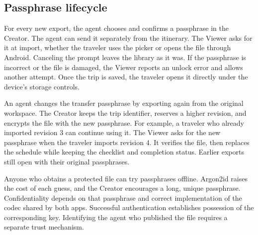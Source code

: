 \subsection{Passphrase lifecycle}
\label{sec:password}

For every new export, the agent chooses and confirms a passphrase in the Creator. The agent can send it separately from the itinerary. The Viewer asks for it at import, whether the traveler uses the picker or opens the file through Android. Canceling the prompt leaves the library as it was. If the passphrase is incorrect or the file is damaged, the Viewer reports an unlock error and allows another attempt. Once the trip is saved, the traveler opens it directly under the device's storage controls.

An agent changes the transfer passphrase by exporting again from the original workspace. The Creator keeps the trip identifier, reserves a higher revision, and encrypts the file with the new passphrase. For example, a traveler who already imported revision 3 can continue using it. The Viewer asks for the new passphrase when the traveler imports revision 4. It verifies the file, then replaces the schedule while keeping the checklist and completion status. Earlier exports still open with their original passphrases.

Anyone who obtains a protected file can try passphrases offline. Argon2id raises the cost of each guess, and the Creator encourages a long, unique passphrase. Confidentiality depends on that passphrase and correct implementation of the codec shared by both apps. Successful authentication establishes possession of the corresponding key. Identifying the agent who published the file requires a separate trust mechanism.
